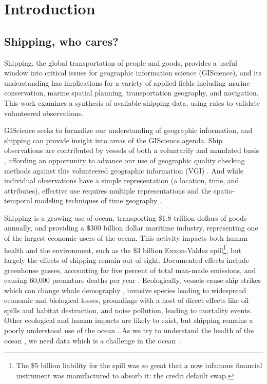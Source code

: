 \section{Introduction}


\subsection{Shipping, who cares?}

Shipping, the global transportation of people and goods, provides a useful window into critical issues for geographic information science (GIScience), and its understanding has implications for a variety of applied fields including marine conservation, marine spatial planning, transportation geography, and navigation.  This work examines a synthesis of available shipping data, using rules to validate volunteered observations.

GIScience seeks to formalize our understanding of geographic information, and shipping can provide insight into areas of the GIScience agenda. Ship observations are contributed by vessels of both a voluntarily and mandated basis \citep{VOSClim,Tetreault2002}, affording an opportunity to advance our use of geographic quality checking methods \citep{goodchildli2012} against this volunteered geographic information (VGI) \citep{goodchild2007citizens}. And while individual observations have a simple representation (a location, time, and attributes), effective use requires multiple representations \citep{Goodchild1992} and the spatio-temporal modeling techniques of time geography \citep{miller2008field}.

Shipping is a growing use of ocean, transporting \$1.8 trillion dollars of goods annually, %
and providing a \$300 billion dollar maritime industry, representing one of the largest economic users of the ocean. This activity impacts both human health and the environment, such as the \$3 billion Exxon-Valdez spill\footnote{The \$5 billion liability for the spill was so great that a now infamous financial instrument was manufactured to absorb it: the credit default swap.}, but largely the effects of shipping remain out of sight. Documented effects include greenhouse gasses, accounting for five percent of total man-made emissions, and causing 60,000 premature deaths per year \cite{Corbett2007}. Ecologically, vessels cause ship strikes which can change whale demography \citep{Fujiwara2001}, %
 invasive species leading to widespread economic and biological losses, groundings with a host of direct effects like oil spills and habitat destruction, and noise pollution, leading to mortality events. Other ecological and human impacts are likely to exist, but shipping remains a poorly understood use of the ocean \citep{Davenport2006}. As we try to understand the health of the ocean \citep{Halpern2012}, we need data %
 which is a challenge in the ocean \cite{Wright1997}.

